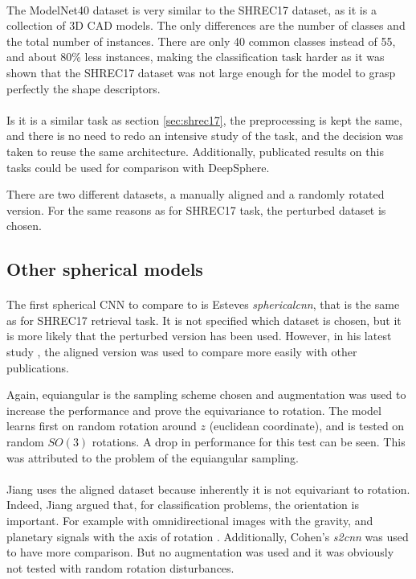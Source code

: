 \documentclass[11pt]{report}
\begin{document}
\paragraph*{}
The ModelNet40 dataset is very similar to the SHREC17 dataset, as it is a collection of 3D CAD models. The only differences are the number of classes and the total number of instances. There are only 40 common classes instead of 55, and about 80\% less instances, making the classification task harder as it was shown that the SHREC17 dataset was not large enough for the model to grasp perfectly the shape descriptors.

\paragraph*{}
Is it is a similar task as section \ref{sec:shrec17}, the preprocessing is kept the same, and there is no need to redo an intensive study of the task, and the decision was taken to reuse the same architecture. Additionally, publicated results on this tasks could be used for comparison with DeepSphere.

There are two different datasets, a manually aligned and a randomly rotated version. For the same reasons as for SHREC17 task, the perturbed dataset is chosen.

\subsection{Other spherical models}
\paragraph*{}
The first spherical CNN to compare to is Esteves \emph{sphericalcnn}, that is the same as for SHREC17 retrieval task. It is not specified which dataset is chosen, but it is more likely that the perturbed version has been used. However, in his latest study \cite{esteves_equivariant_2019}, the aligned version was used to compare more easily with other publications.

Again, equiangular is the sampling scheme chosen and  augmentation was used to increase the performance and prove the equivariance to rotation. The model learns first on random rotation around $z$ (euclidean coordinate), and is tested on random $SO(3)$ rotations. A drop in performance for this test can be seen. This was attributed to the problem of the equiangular sampling.

\paragraph*{}
Jiang uses the aligned dataset because inherently it is not equivariant to rotation. Indeed, Jiang argued that, for classification problems, the orientation is important. For example with omnidirectional images with the gravity, and planetary signals with the axis of rotation \cite{jiang_spherical_2019}.
Additionally, Cohen's \emph{s2cnn} was used to have more comparison. But no augmentation was used and it was obviously not tested with random rotation disturbances.
\end{document}
